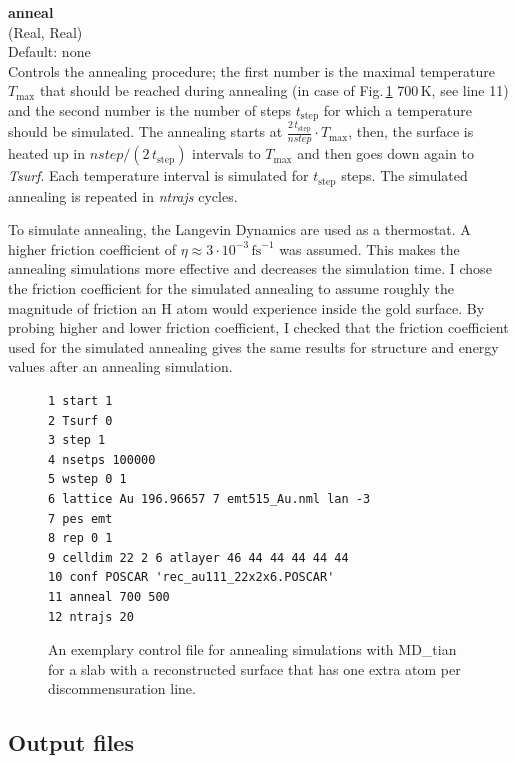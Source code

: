 \documentclass[twoside, 11pt, titlepage, captions=nooneline, a4paper, headsepline]{scrbook}%
\newcommand{\9}{\mathrm}
\newcommand{\0}{\,\mathrm}
\begin{document}
\textbf{anneal}\\
(Real, Real)\\
Default: none\\
Controls the annealing procedure; the first number is the maximal temperature $T_\mathrm{max}$ that should be reached during annealing (in case of Fig.\,\ref{Fig:mxt:anneal} 700\,K, see line 11) and the second number is the number of steps $t_\mathrm{step}$ for which a temperature should be simulated.
The annealing starts at $\tfrac{2\,t_\mathrm{step}}{nstep} \cdot T_\mathrm{max}$, then, the surface is heated up in $nstep/(2\,t_\mathrm{step})$ intervals to $T_\mathrm{max}$ and then goes down again to \textit{Tsurf}. Each temperature interval is simulated for $t_\mathrm{step}$ steps. The simulated annealing is repeated in \textit{ntrajs} cycles.

To simulate annealing, the Langevin Dynamics are used as a thermostat. A higher friction coefficient of $\eta \approx 3\cdot10^{-3}$\,$\mathrm{fs}^{-1}$ was assumed. This makes the annealing simulations more effective and decreases the simulation time. I chose the friction coefficient for the simulated annealing to assume roughly the magnitude of friction an H atom would experience inside the gold surface. By probing higher and lower friction coefficient, I checked that the friction coefficient used for the simulated annealing gives the same results for structure and energy values after an annealing simulation.

\begin{figure}[b!]
\begin{verbatim}
1 start 1
2 Tsurf 0
3 step 1
4 nsetps 100000
5 wstep 0 1
6 lattice Au 196.96657 7 emt515_Au.nml lan -3
7 pes emt
8 rep 0 1
9 celldim 22 2 6 atlayer 46 44 44 44 44 44
10 conf POSCAR 'rec_au111_22x2x6.POSCAR'
11 anneal 700 500
12 ntrajs 20
\end{verbatim}
\caption{\label{Fig:mxt:anneal}An exemplary control file for annealing simulations with MD\_tian for a slab with a reconstructed surface that has one extra atom per discommensuration line.}
\end{figure}


\subsection{Output files}
\label{Sec:mxt:output}
\end{document}
